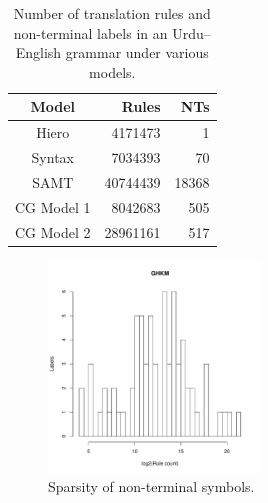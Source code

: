 \documentclass[a4paper]{article}
\begin{document}
\begin{table}
\centering
\begin{tabular}{|c|r|r|}
\hline
Model & Rules & NTs\\
\hline
Hiero & 4171473 & 1\\
Syntax & 7034393 & 70\\
SAMT & 40744439 & 18368\\
CG Model 1 & 8042683 & 505\\
CG Model 2 & 28961161 & 517\\
\hline
\end{tabular}
\caption{Number of translation rules and non-terminal labels in an Urdu--English grammar under various models.\label{table:rule-count}}
\end{table}


\begin{figure}[t]
\includegraphics[width=0.5\textwidth]{figures/ghkm}
\caption{Sparsity of non-terminal symbols.\label{fig:hist1}}
\end{figure}
\end{document}
